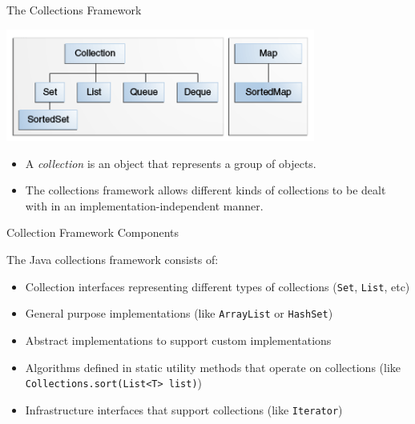 \documentclass{beamer}
\author[Chris Simpkins]
{Christopher Simpkins \\\texttt{chris.simpkins@gatech.edu}}
\institute[Georgia Tech] %
\date[CS 1331]{}
\begin{document}
\begin{frame}
  \titlepage
\end{frame}

\begin{frame}[fragile]{The Collections Framework}

\begin{center}
\includegraphics[width=4in]{colls-coreInterfaces.png}
\end{center}

\begin{itemize}
\item A {\it collection} is an object that represents a group of objects.
\item The collections framework allows different kinds of collections to be dealt with in an implementation-independent manner.
\end{itemize}


\end{frame}

\begin{frame}[fragile]{Collection Framework Components}

The Java collections framework consists of:
\begin{itemize}
\item Collection interfaces representing different types of collections ({\tt Set}, {\tt List}, etc)
\item General purpose implementations (like {\tt ArrayList} or {\tt HashSet})
\item Abstract implementations to support custom implementations
\item Algorithms defined in static utility methods that operate on collections (like {\tt Collections.sort(List<T> list)})
\item Infrastructure interfaces that support collections (like {\tt Iterator})
\end{itemize}

\end{frame}
\end{document}

